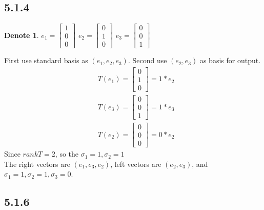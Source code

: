 \documentclass{article}
\newtheorem*{denote}{Denote}
\begin{document}
\subsection*{5.1.4}
\begin{denote}
    $e_1 = \begin{bmatrix}
        1 \\ 0 \\ 0
    \end{bmatrix}$
    $e_2 = \begin{bmatrix}
        0 \\ 1 \\ 0
    \end{bmatrix}$
    $e_3 = \begin{bmatrix}
        0 \\ 0 \\ 1
    \end{bmatrix}$
\end{denote}
First use standard basis as $(e_1, e_2, e_3)$. Second use $(e_2, e_3)$ as basis for output. \\
\begin{equation*}
    \begin{split}
        &T(e_1) = \begin{bmatrix}
            0 \\  1 \\ 0
        \end{bmatrix} = 1 * e_2\\
        &T(e_3) = \begin{bmatrix}
            0 \\  0 \\ 1
        \end{bmatrix} = 1 * e_3 \\
        &T(e_2) = \begin{bmatrix}
            0 \\  0 \\ 0
        \end{bmatrix} = 0 * e_2 
    \end{split}
\end{equation*}
Since $rank T = 2$, so the $\sigma_1 = 1, \sigma_2 = 1$ \\
The right vectors are $(e_1, e_3, e_2)$, left vectors are $(e_2, e_3)$, and $\sigma_1 = 1, \sigma_2 = 1, \sigma_3 =0$.

\subsection*{5.1.6}
\end{document}
